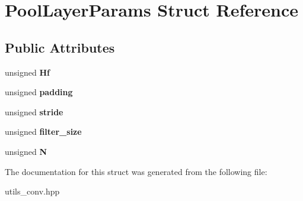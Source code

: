 \hypertarget{struct_pool_layer_params}{}\section{Pool\+Layer\+Params Struct Reference}
\label{struct_pool_layer_params}
\subsection*{Public Attributes}
\begin{DoxyCompactItemize}
\item 
\hypertarget{struct_pool_layer_params_a3a246dae600ef42be216a6b49486ed25}{}unsigned {\bfseries Hf}\label{struct_pool_layer_params_a3a246dae600ef42be216a6b49486ed25}

\item 
\hypertarget{struct_pool_layer_params_ad8dd2860fdcb3a9ec00fe945555224cc}{}unsigned {\bfseries padding}\label{struct_pool_layer_params_ad8dd2860fdcb3a9ec00fe945555224cc}

\item 
\hypertarget{struct_pool_layer_params_a161de5e8ba3c56cb2af6c42b80996877}{}unsigned {\bfseries stride}\label{struct_pool_layer_params_a161de5e8ba3c56cb2af6c42b80996877}

\item 
\hypertarget{struct_pool_layer_params_a897d646200ed4f01dc43045a8b74ba85}{}unsigned {\bfseries filter\+\_\+size}\label{struct_pool_layer_params_a897d646200ed4f01dc43045a8b74ba85}

\item 
\hypertarget{struct_pool_layer_params_acaa63212cc48f33f27b09cbb30806396}{}unsigned {\bfseries N}\label{struct_pool_layer_params_acaa63212cc48f33f27b09cbb30806396}

\end{DoxyCompactItemize}


The documentation for this struct was generated from the following file\+:\begin{DoxyCompactItemize}
\item 
utils\+\_\+conv.\+hpp\end{DoxyCompactItemize}
